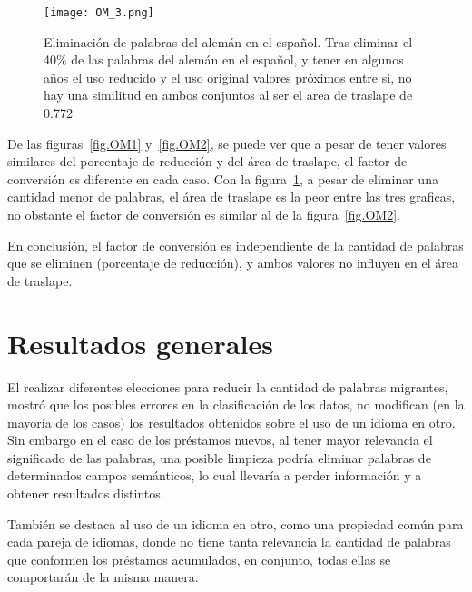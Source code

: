 \begin{figure}[]
	\centering
	\texttt{[image: OM\_3.png]}
	\caption{Eliminación de palabras del alemán en el español. Tras eliminar el 40$\%$ de las palabras del alemán en el español, y  tener en algunos años el uso reducido y el uso original valores próximos entre si, no hay una similitud en ambos conjuntos al ser el area de traslape de 0.772}
	\label{fig.OM3}
\end{figure}


De las figuras~\ref{fig.OM1} y~\ref{fig.OM2}, se puede ver que a pesar de tener valores similares del porcentaje de reducción y del área de traslape, el factor de conversión es diferente en cada caso. Con la figura~\ref{fig.OM3}, a pesar de eliminar una cantidad menor de palabras, el área de traslape es la peor entre las tres graficas, no obstante el factor de conversión es similar al de la figura~\ref{fig.OM2}.

En conclusión, el factor de conversión es independiente de la cantidad de palabras que se eliminen (porcentaje de reducción), y ambos valores no influyen en el área de traslape.


\section{Resultados generales}

El realizar diferentes elecciones para reducir la cantidad de palabras migrantes, mostró que los posibles errores en la clasificación de los datos, no modifican (en la mayoría de los casos) los resultados obtenidos sobre el uso de un idioma en otro. Sin embargo en el caso de los préstamos nuevos, al tener mayor relevancia el significado de las palabras, una posible limpieza podría eliminar palabras de determinados campos semánticos, lo cual llevaría a perder información y a obtener resultados distintos. 

También se destaca al uso de un idioma en otro, como una propiedad común para cada pareja de idiomas, donde no tiene tanta relevancia la cantidad de palabras que conformen los préstamos acumulados,  en conjunto, todas ellas se comportarán de la misma manera. 


